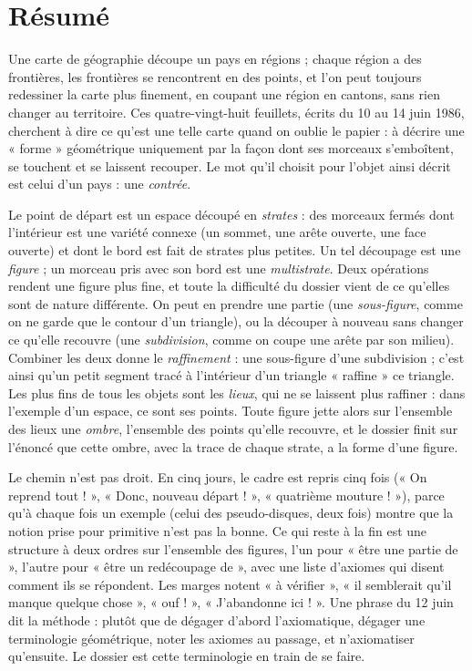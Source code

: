 \documentclass[11pt,a4paper]{article}
\begin{document}
\section*{Résumé}

\begin{resume}
Une carte de géographie découpe un pays en régions ; chaque région a des
frontières, les frontières se rencontrent en des points, et l'on peut toujours
redessiner la carte plus finement, en coupant une région en cantons, sans rien
changer au territoire. Ces quatre-vingt-huit feuillets, écrits du 10 au 14 juin
1986, cherchent à dire ce qu'est une telle carte quand on oublie le papier : à
décrire une « forme » géométrique uniquement par la façon dont ses morceaux
s'emboîtent, se touchent et se laissent recouper. Le mot qu'il choisit pour
l'objet ainsi décrit est celui d'un pays : une \emph{contrée}.

Le point de départ est un espace découpé en \emph{strates} : des morceaux
fermés dont l'intérieur est une variété connexe (un sommet, une arête
ouverte, une face ouverte) et dont le bord est fait de strates plus petites.
Un tel découpage est une \emph{figure} ; un morceau pris avec son bord est une
\emph{multistrate}. Deux opérations rendent une figure plus fine, et toute la
difficulté du dossier vient de ce qu'elles sont de nature différente. On peut
en prendre une partie (une \emph{sous-figure}, comme on ne garde que le contour
d'un triangle), ou la découper à nouveau sans changer ce qu'elle recouvre (une
\emph{subdivision}, comme on coupe une arête par son milieu). Combiner les deux
donne le \emph{raffinement} : une sous-figure d'une subdivision ; c'est ainsi
qu'un petit segment tracé à l'intérieur d'un triangle « raffine » ce triangle.
Les plus fins de tous les objets sont les \emph{lieux}, qui ne se laissent plus
raffiner : dans l'exemple d'un espace, ce sont ses points. Toute figure jette
alors sur l'ensemble des lieux une \emph{ombre}, l'ensemble des points qu'elle
recouvre, et le dossier finit sur l'énoncé que cette ombre, avec la trace de
chaque strate, a la forme d'une figure.

Le chemin n'est pas droit. En cinq jours, le cadre est
repris cinq fois (« On reprend tout ! », « Donc, nouveau départ ! »,
« quatrième mouture ! »), parce qu'à chaque fois un exemple (celui des
pseudo-disques, deux fois) montre que la notion prise pour primitive n'est pas
la bonne. Ce qui reste à la fin est une structure à deux ordres sur l'ensemble
des figures, l'un pour « être une partie de », l'autre pour « être un
redécoupage de », avec une liste d'axiomes qui disent comment ils se
répondent. Les marges notent « à vérifier », « il semblerait qu'il manque
quelque chose », « ouf ! », « J'abandonne ici ! ». Une phrase du 12 juin
dit la méthode : plutôt que de dégager d'abord
l'axiomatique, dégager une terminologie géométrique, noter les axiomes au
passage, et n'axiomatiser qu'ensuite. Le dossier est cette terminologie en
train de se faire.


\end{resume}
\end{document}
